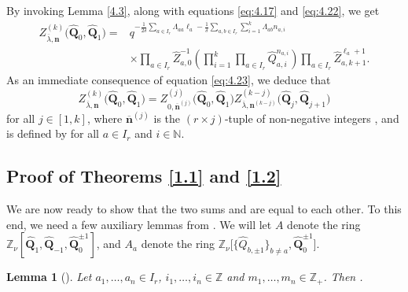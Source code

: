 \documentclass[pdftex]{sigma}
\numberwithin{equation}{section}
\newtheorem{Lemma}[Theorem]{Lemma}
\begin{document}
By invoking Lemma \ref{4.3}, along with equations \eqref{eq:4.17} and \eqref{eq:4.22}, we get
\begin{align}
Z_{\overline{\lambda},\mathbf{n}}^{(k)}\bigl(\widehat{\mathbf{Q}}_0,\widehat{\mathbf{Q}}_1\bigr)
={}&q^{-\frac{1}{2\delta}\sum_{a\in I_r}\Lambda_{aa}\ell_a-\frac{1}{\delta}\sum_{a,b\in I_r}\sum_{i=1}^k\Lambda_{ab}n_{a,i}}\nonumber\\
&\times\prod_{a\in I_r}\widehat{Z}_{a,0}^{-1}\left(\prod_{i=1}^k\prod_{a\in I_r}\widehat{Q}_{a,i}^{n_{a,i}}\right)\prod_{a\in I_r}\widehat{Z}_{a,k+1}^{\ell_a+1}.\label{eq:4.23}
\end{align}
As an immediate consequence of equation \eqref{eq:4.23}, we deduce that
\begin{equation}\label{eq:4.24}
Z_{\overline{\lambda},\mathbf{n}}^{(k)}\bigl(\widehat{\mathbf{Q}}_0,\widehat{\mathbf{Q}}_1\bigr)
=Z_{0,\overline{\mathbf{n}}^{(j)}}^{(j)}\bigl(\widehat{\mathbf{Q}}_0,\widehat{\mathbf{Q}}_1\bigr)Z_{\overline{\lambda},\mathbf{n}^{(k-j)}}^{(k-j)}
\bigl(\widehat{\mathbf{Q}}_j,\widehat{\mathbf{Q}}_{j+1}\bigr)
\end{equation}
for all $j\in[1,k]$, where $\overline{\mathbf{n}}^{(j)}$ is the $(r\times j)$-tuple of non-negative integers , and  is defined by  for all $a\in I_r$ and $i\in\mathbb{N}$.

\subsection[Proof of Theorems 1.1 and 1.2]{Proof of Theorems \ref{1.1} and \ref{1.2}}\label{Section 4.4}

We are now ready to show that the two sums  and  are equal to each other. To this end, we need a few auxiliary lemmas from \cite[Section 5.5]{DFK14}. We will let $A$ denote the ring~${\mathbb{Z}_{\nu}[\widehat{\mathbf{Q}}_1,\widehat{\mathbf{Q}}_{-1},\widehat{\mathbf{Q}}_0^{\pm1}]}$, and $A_a$ denote the ring $\mathbb{Z}_{\nu}\bigl[\bigl\{\widehat{Q}_{b,\pm1}\bigr\}_{b\neq a},\widehat{\mathbf{Q}}_0^{\pm1}\bigr]$.

\begin{Lemma}[{\cite[Lemma 5.9]{DFK14}}]\label{4.9}
Let $a_1,\dots,a_n\in I_r$, $i_1,\dots,i_n\in\mathbb{Z}$ and $m_1,\dots,m_n\in\mathbb{Z}_+$. Then .
\end{Lemma}
\end{document}
